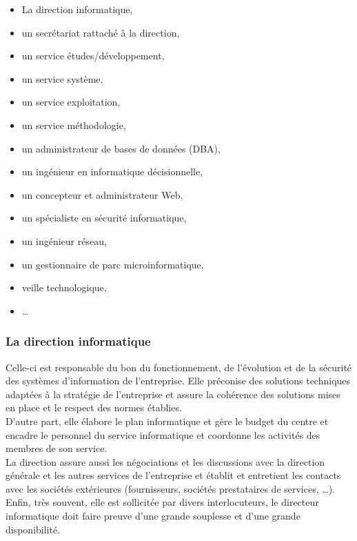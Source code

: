 \documentclass[10pt,a4paper,oneside,titlepage]{report}
\begin{document}
\begin{itemize}
\item La direction informatique,
\item un secrétariat rattaché à la direction,
\item un service études/développement,
\item un service système,
\item un service exploitation,
\item un service méthodologie,
\item un administrateur de bases de données (DBA),
\item un ingénieur en informatique décisionnelle,
\item un concepteur et administrateur Web,
\item un spécialiste en sécurité informatique,
\item un ingénieur réseau,
\item un gestionnaire de parc microinformatique,
\item veille technologique,
\item \dots
\end{itemize}

\subsubsection{La direction informatique}
Celle-ci est responsable du bon du fonctionnement, de l'évolution et de la
sécurité des systèmes d'information de l'entreprise. Elle préconise des
solutions techniques adaptées à la stratégie de l’entreprise et assure la
cohérence des solutions mises en place et le respect des normes établies.\\

D'autre part, elle élabore le plan informatique et gère le budget du centre et
encadre le personnel du service informatique et coordonne les activités des
membres de son service.\\

La direction assure aussi les négociations et les discussions avec la direction
générale et les autres services de l’entreprise et établit et entretient les
contacts avec les sociétés extérieures (fournisseurs, sociétés prestataires de
services, \dots).\\

Enfin, très souvent, elle est sollicitée par divers interlocuteurs, le directeur
informatique doit faire preuve d’une grande souplesse et d’une grande
disponibilité.\\
\end{document}

